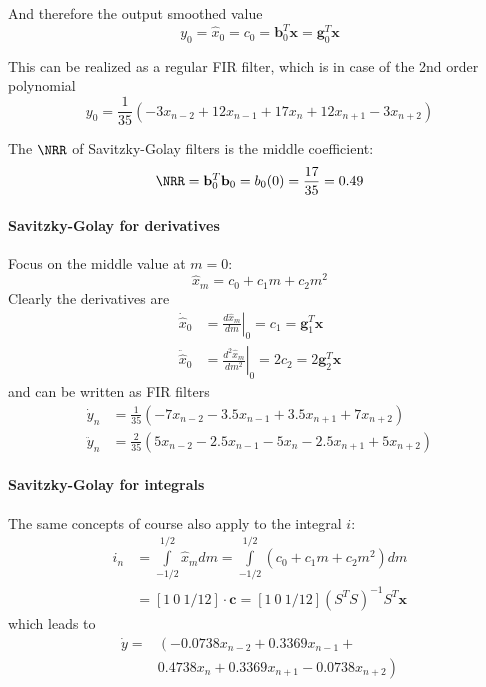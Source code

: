 And therefore the output smoothed value
\begin{equation*}
	y_0 = \hat{x}_0 = c_0 = \mathbf{b}_0^T \mathbf{x} = \mathbf{g}_0^T \mathbf{x}
\end{equation*}

This can be realized as a regular FIR filter, which is in case of the 2nd order
polynomial
\begin{equation*}
	y_0 = \frac{1}{35} \left( -3 x_{n-2} + 12 x_{n-1} + 17 x_n + 12 x_{n+1} - 3 x_{n+2}\right)
\end{equation*}

The $\NRR$ of Savitzky-Golay filters is the middle coefficient:
\begin{equation*}
	\NRR = \mathbf{b}_0^T \mathbf{b}_0 = b_0(0) = \frac{17}{35} = 0.49
\end{equation*}

\paragraph{Savitzky-Golay for derivatives}
Focus on the middle value at $m=0$:
\begin{equation*}
	\hat{x}_m = c_0 + c_1 m + c_2 m^2
\end{equation*}
Clearly the derivatives are
\begin{align*}
	\dot{\hat{x}}_0 &=  \left.\frac{d\hat{x}_m}{dm}\right|_0 = c_1 = \mathbf{g}_1^T\mathbf{x} \\
	\ddot{\hat{x}}_0 &= \left.\frac{d^2\hat{x}_m}{dm^2}\right|_0 = 2 c_2 = 2 \mathbf{g}_2^T\mathbf{x}
\end{align*}
and can be written as FIR filters
\begin{align*}
	\dot{y}_n &= \frac{1}{35} \left( -7 x_{n-2} - 3.5 x_{n-1} + 3.5 x_{n+1} + 7 x_{n+2}\right) \\
	\ddot{y}_n &= \frac{2}{35} \left( 5 x_{n-2} - 2.5 x_{n-1} - 5 x_n - 2.5 x_{n+1} + 5 x_{n+2}\right)
\end{align*}

\paragraph{Savitzky-Golay for integrals}
The same concepts of course also apply to  the integral $i$:
\begin{align*}
	i_n &= \int\limits_{-1/2}^{1/2} \hat{x}_m dm = \int\limits_{-1/2}^{1/2} (c_0 + c_1 m + c_2 m^2) dm \\
	&= \left[1 \: 0 \: 1/12 \right] \cdot \mathbf{c} = \left[1 \: 0 \: 1/12 \right] \left(S^T S \right)^{-1} S^T \mathbf{x}
\end{align*}
which leads to
\begin{align*}
	\dot{y} = & \left(-0.0738 x_{n-2} + 0.3369 x_{n-1} + \right. \\
	& \left. 0.4738 x_n + 0.3369 x_{n+1} - 0.0738 x_{n+2}  \right) \\
\end{align*}

